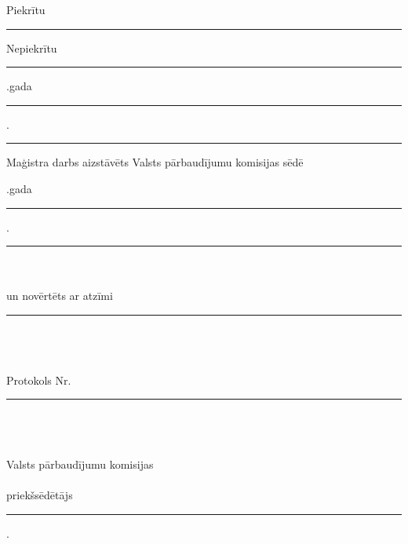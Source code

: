 \documentclass[12pt,paper=a4]{report}
\begin{document}
\begin{flushright}
	Piekrītu \rule{3cm}{0.2pt}
	\vspace{1.5cm}
	
	Nepiekrītu \rule{3cm}{0.2pt}
	
\end{flushright}

\vspace{1cm}
.gada \rule{1cm}{0.2pt}.\rule{3cm}{0.2pt}

\pagestyle{empty}

\newpage
\begin{center}
 Maģistra darbs aizstāvēts Valsts pārbaudījumu komisijas sēdē\\
 \vspace{1em}
\end{center}
.gada \rule{1cm}{0.2pt} . \rule{3cm}{0.2pt}\\\\
un novērtēts ar atzīmi \rule{4cm}{0.2pt} \\\\\\
Protokols Nr. \rule{1cm}{0.2pt}\\\\\\
Valsts pārbaudījumu komisijas \\\\
priekšsēdētājs \rule{7cm}{0.2pt}.\\
\hspace*{5cm}\textit{\raisebox{1em}{paraksts}}
\end{document}
